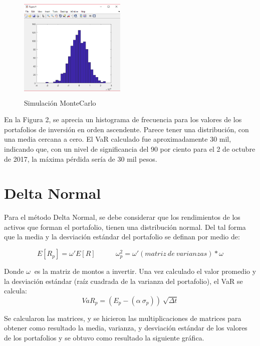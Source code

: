 \documentclass[12pt]{article}
\begin{document}
\begin{figure}[h]
\begin{minipage}{7in}
\begin{center}
\includegraphics[width=2in,height=2in]{montecarlo.PNG}
\caption{Simulación MonteCarlo} 
\label{Figure 2} 
\end{center}
\end{minipage}
\end{figure}

En la Figura 2, se aprecia un histograma de frecuencia para los valores de los portafolios de inversión en orden ascendente. Parece tener una distribución, con una media cercana a cero. El VaR calculado fue aproximadamente 30 mil, indicando que, con un nivel de significancia del 90 por ciento para el 2 de octubre de 2017, la máxima pérdida sería de 30 mil pesos.

\section{Delta Normal}
Para el método Delta Normal, se debe considerar que los rendimientos de los activos que forman el portafolio, tienen una distribución normal. Del tal forma que la media y la desviación estándar del portafolio se definan por medio de:

$$E[R_{p}] = \omega ' E[R] \: \: \: \: \: \: \: \: \: \: \:\: \: \omega_{p}^2 = \omega ' (matriz\:de\:varianzas) * \omega$$ \: \: \: \: 

Donde $ \omega\:$ es la matriz de montos a invertir. Una vez calculado el valor promedio y la desviación estándar (raíz cuadrada de la varianza del portafolio), el VaR se calcula:
$$ VaR_{p} = (E_{p}-(\alpha \:\sigma_{p}))\:\sqrt{\Delta t}$$

Se calcularon las matrices, y se hicieron las multiplicaciones de matrices para obtener como resultado la media, varianza, y desviación estándar de los valores de los portafolios y se obtuvo como resultado la siguiente gráfica.
\end{document}
